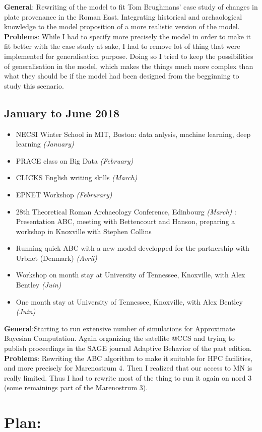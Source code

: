 \documentclass[a4paper]{article}
\begin{document}
	{\small
	\noindent \textbf{General}: Rewriting of the model to fit Tom Brughmans' case study of changes in plate provenance in the Roman East. Integrating historical and archaological knowledge to the model proposition of a more realistic version of the model.\\
	    \textbf{Problems}: While I had to specify more precisely the model in order to make it fit better with the case study at sake, I had to remove lot of thing that were implemented for generalisation purpose. Doing so I tried to keep the possibilities of generalisation in the model, which makes the things much more complex than what they should be if the model had been designed from the begginning to study this scenario. 
	}

\subsection*{January to June 2018}
	\begin{itemize}
	    \item NECSI Winter School in MIT, Boston: data anlysis, machine learning, deep learning \emph{(January)}
	    \item PRACE class on Big Data \emph{(February)}
	    \item CLICKS English writing skills \emph{(March)}
	    \item EPNET Workshop \emph{(Februrary)}
	    \item 28th Theoretical Roman Archaeology Conference, Edinbourg \emph{(March)}
:  Presentation ABC, meeting with Bettencourt and Hanson, preparing a workshop in Knoxville with Stephen Collins	    
        \item Running quick ABC with a new model developped for the partnership with Urbnet (Denmark) \emph{(Avril)}
        \item Workshop on  month stay at University of Tennessee, Knoxville, with Alex Bentley \emph{(Juin)}
        \item One month stay at University of Tennessee, Knoxville, with Alex Bentley \emph{(Juin)}
	\end{itemize}
	{\small
	\noindent   \textbf{General}:Starting to run extensive number of simulations for Approximate Bayesian Computation. Again organizing the satellite @CCS and trying to publish proceedings in the SAGE journal Adaptive Behavior  of the past edition.\\
    \textbf{Problems}: Rewriting the ABC algorithm to make it suitable for HPC facilities, and more precisely for Marenostrum 4. Then I realized that our access to MN is really limited. Thus I had to rewrite most of the thing to run it again on nord 3 (some remainings part of the Marenostrum 3).
	}

	\section*{Plan:}
\end{document}
